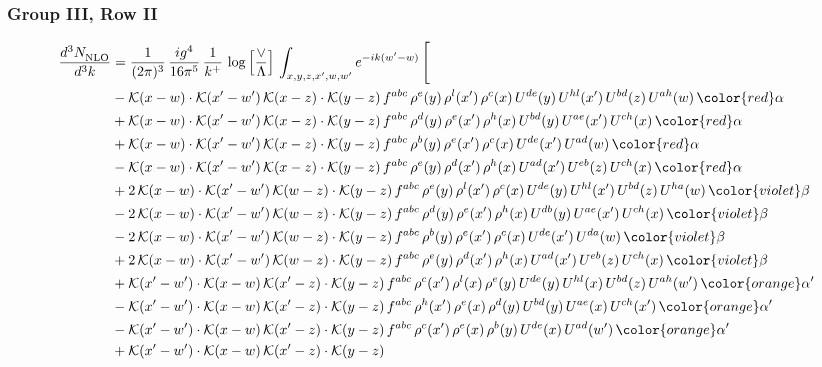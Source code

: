 \subsubsection{Group III, Row II}
\begin{align}
     \frac{d^{3}N_{\rm NLO}^{\rm}}{d^{3}k}  & = \frac{1}{(2\pi)^{3}}\, \frac{ig^{4}}{16\pi^{5}}\, \frac{1}{k^{+}}\, \log{\left[\frac{\vee}{\Lambda}\right]}\, \int_{x,y,z,x^{\prime},w,w^{\prime}}e^{-ik(w^{\prime}-w)}\, \Bigg[\notag \\ & -\mathcal{K}(x-w)\cdot \mathcal{K}(x'-w')\, \mathcal{K}(x-z)\cdot \mathcal{K}(y-z)\, f^{abc}\, \rho^{e}(y)\,\rho^{l}(x')\,\rho^{c}(x)\,U^{de}(y)\,U^{hl}(x')\,U^{bd}(z)\,U^{ah}(w)\, {\color{red}\alpha} \notag \\ & +\mathcal{K}(x-w)\cdot \mathcal{K}(x'-w')\, \mathcal{K}(x-z)\cdot \mathcal{K}(y-z)\, f^{abc}\, \rho^{d}(y)\,\rho^{e}(x')\,\rho^{h}(x)\,U^{bd}(y)\,U^{ae}(x')\,U^{ch}(x)\, {\color{red}\alpha} \notag \\ & + \mathcal{K}(x-w)\cdot \mathcal{K}(x'-w')\, \mathcal{K}(x-z)\cdot \mathcal{K}(y-z)\, f^{abc}\, \rho^{b}(y)\,\rho^{e}(x')\,\rho^{c}(x)\,U^{de}(x')\,U^{ad}(w)\, {\color{red}\alpha} \notag \\ & -\mathcal{K}(x-w)\cdot \mathcal{K}(x'-w')\, \mathcal{K}(x-z)\cdot \mathcal{K}(y-z)\, f^{abc}\, \rho^{e}(y)\,\rho^{d}(x')\,\rho^{h}(x)\,U^{ad}(x')\,U^{eb}(z)\,U^{ch}(x)\, {\color{red}\alpha} \notag \\ & +2\, \mathcal{K}(x-w)\cdot \mathcal{K}(x'-w')\, \mathcal{K}(w-z) \cdot \mathcal{K}(y-z)\, f^{abc}\, \rho^{e}(y)\,\rho^{l}(x')\, \rho^{c}(x)\, U^{de}(y)\,U^{hl}(x')\,U^{bd}(z)\,U^{ha}(w)\, {\color{violet} \beta} \notag \\ & -2\, \mathcal{K}(x-w)\cdot \mathcal{K}(x'-w')\, \mathcal{K}(w-z) \cdot \mathcal{K}(y-z)\, f^{abc}\, \rho^{d}(y)\,\rho^{e}(x')\, \rho^{h}(x)\, U^{db}(y)\,U^{ae}(x')\,U^{ch}(x)\, {\color{violet} \beta}\notag \\ & -2\, \mathcal{K}(x-w)\cdot \mathcal{K}(x'-w')\, \mathcal{K}(w-z) \cdot \mathcal{K}(y-z)\, f^{abc}\, \rho^{b}(y)\,\rho^{e}(x')\, \rho^{c}(x)\, U^{de}(x')\,U^{da}(w)\, {\color{violet} \beta}\notag \\ & + 2\, \mathcal{K}(x-w)\cdot \mathcal{K}(x'-w')\, \mathcal{K}(w-z) \cdot \mathcal{K}(y-z)\, f^{abc}\, \rho^{e}(y)\,\rho^{d}(x')\, \rho^{h}(x)\, U^{ad}(x')\,U^{eb}(z)\,U^{ch}(x)\, {\color{violet} \beta}\notag \\ & +\mathcal{K}(x'-w')\cdot\mathcal{K}(x-w)\,\mathcal{K}(x'-z)\cdot\mathcal{K}(y-z)\, f^{abc}\,\rho^{c}(x')\,\rho^{l}(x)\,\rho^{e}(y)\,U^{de}(y)\,U^{hl}(x)\,U^{bd}(z)\,U^{ah}(w')\,{\color{orange} \alpha'}\notag\\ & -\mathcal{K}(x'-w')\cdot\mathcal{K}(x-w)\,\mathcal{K}(x'-z)\cdot\mathcal{K}(y-z)\, f^{abc}\,\rho^{h}(x')\,\rho^{e}(x)\,\rho^{d}(y)\,U^{bd}(y)\,U^{ae}(x)\,U^{ch}(x')\,{\color{orange} \alpha'}\notag\\ &-\mathcal{K}(x'-w')\cdot\mathcal{K}(x-w)\,\mathcal{K}(x'-z)\cdot\mathcal{K}(y-z)\, f^{abc}\,\rho^{c}(x')\,\rho^{e}(x)\,\rho^{b}(y)\,U^{de}(x)\,U^{ad}(w')\,{\color{orange} \alpha'}\notag\\ & +\mathcal{K}(x'-w')\cdot\mathcal{K}(x-w)\,\mathcal{K}(x'-z)\cdot\mathcal{K}(y-z)\, 
\end{align}
